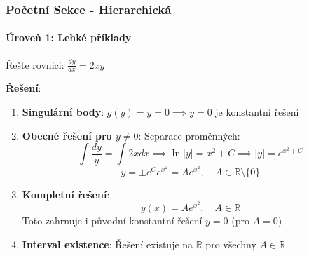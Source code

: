 \subsubsection{Početní Sekce - Hierarchická}
\label{subsubsec:pocetni-sekce}

\paragraph*{Úroveň 1: Lehké příklady}

\begin{example}
    Řešte rovnici: $\frac{dy}{dx} = 2xy$
    
    \vspace{0.3\baselineskip}
    
    \textbf{Řešení}: 
    \begin{enumerate}
    \item \textbf{Singulární body}: $g(y) = y = 0 \implies y = 0$ je konstantní řešení
    
    \item \textbf{Obecné řešení pro $y \neq 0$}: Separace proměnných:
    \[
    \int \frac{dy}{y} = \int 2x  dx \implies \ln|y| = x^2 + C \implies |y| = e^{x^2 + C}
    \]
    \[
    y = \pm e^C e^{x^2} = Ae^{x^2}, \quad A \in \mathbb{R}\setminus\{0\}
    \]
    
    \item \textbf{Kompletní řešení}: 
    \[
    y(x) = Ae^{x^2}, \quad A \in \mathbb{R}
    \]
    Toto zahrnuje i původní konstantní řešení $y = 0$ (pro $A = 0$)
    
    \item \textbf{Interval existence}: Řešení existuje na $\mathbb{R}$ pro všechny $A \in \mathbb{R}$
    \end{enumerate}
    \end{example}

\vspace{0.6\baselineskip}

